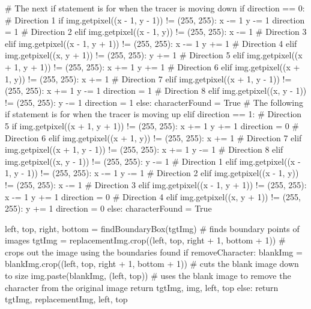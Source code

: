 \documentclass{report}
\begin{document}
\begin{python}
        #  The next if statement is for when the tracer is moving down
        if direction == 0:
            # Direction 1
            if img.getpixel((x - 1, y - 1)) != (255, 255):
                x -= 1
                y -= 1
                direction = 1
            # Direction 2
            elif img.getpixel((x - 1, y)) != (255, 255):
                x -= 1
            # Direction 3
            elif img.getpixel((x - 1, y + 1)) != (255, 255):
                x -= 1
                y += 1
            # Direction 4
            elif img.getpixel((x, y + 1)) != (255, 255):
                y += 1
            # Direction 5
            elif img.getpixel((x + 1, y + 1)) != (255, 255):
                x += 1
                y += 1
            # Direction 6
            elif img.getpixel((x + 1, y)) != (255, 255):
                x += 1
            # Direction 7
            elif img.getpixel((x + 1, y - 1)) != (255, 255):
                x += 1
                y -= 1
                direction = 1
            # Direction 8
            elif img.getpixel((x, y - 1)) != (255, 255):
                y -= 1
                direction = 1
            else:
                characterFound = True
        #  The following if statement is for when the tracer is moving up
        elif direction == 1:
            # Direction 5
            if img.getpixel((x + 1, y + 1)) != (255, 255):
                x += 1
                y += 1
                direction = 0
            # Direction 6
            elif img.getpixel((x + 1, y)) != (255, 255):
                x += 1
            # Direction 7
            elif img.getpixel((x + 1, y - 1)) != (255, 255):
                x += 1
                y -= 1
            # Direction 8
            elif img.getpixel((x, y - 1)) != (255, 255):
                y -= 1
            # Direction 1
            elif img.getpixel((x - 1, y - 1)) != (255, 255):
                x -= 1
                y -= 1
            # Direction 2
            elif img.getpixel((x - 1, y)) != (255, 255):
                x -= 1
            # Direction 3
            elif img.getpixel((x - 1, y + 1)) != (255, 255):
                x -= 1
                y += 1
                direction = 0
            # Direction 4
            elif img.getpixel((x, y + 1)) != (255, 255):
                y += 1
                direction = 0
            else:
                characterFound = True

    left, top, right, bottom = findBoundaryBox(tgtImg)  # finds boundary points of images
    tgtImg = replacementImg.crop((left, top, right + 1, bottom + 1))  # crops out the image using the boundaries found
    if removeCharacter:
        blankImg = blankImg.crop((left, top, right + 1, bottom + 1))  # cuts the blank image down to size
        img.paste(blankImg, (left, top))  # uses the blank image to remove the character from the original image
        return tgtImg, img, left, top
    else:
        return tgtImg, replacementImg, left, top
\end{python}
\end{document}
